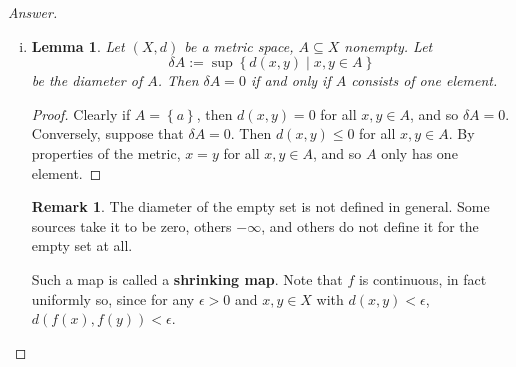 \documentclass[12pt]{article}
\newcommand\paren[1]{\left( #1 \right)}
\newcommand\setb[1]{\left \{ #1 \right \}}
\newtheorem{lemma}[theorem]{Lemma}
\theoremstyle{definition}
\newtheorem*{remark}{Remark}
\begin{document}
\begin{proof}[Answer]
    \noindent
    \begin{enumerate}[(i)]
        \item 
        \begin{lemma}
            Let $(X,d)$ be a metric space, $A \subseteq X$ nonempty. Let 
            \[
                \delta A := \sup \setb{ d(x,y) \mid x , y \in A }
            \]
            be the diameter of $A$. Then $\delta A = 0$ if and only if $A$ consists of one element.
        \end{lemma}
        \begin{proof}
            Clearly if $A = \setb{ a }$, then $d(x,y) = 0$ for all $x , y \in A$, and so $\delta A = 0$. Conversely, suppose that $\delta A = 0$. Then $d(x,y) \leq 0$ for all $x , y \in A$. By properties of the metric, $x = y$ for all $x , y \in A$, and so $A$ only has one element.
        \end{proof}
        \begin{remark}
            The diameter of the empty set is not defined in general. Some sources take it to be zero, others $-\infty$, and others do not define it for the empty set at all.
        \end{remark}
        Such a map is called a \textbf{shrinking map}. Note that $f$ is continuous, in fact uniformly so, since for any $\epsilon > 0$ and $x , y \in X$ with $d(x,y) < \epsilon$, $d \paren{ f(x) , f(y) } < \epsilon$.
        

\end{enumerate}
\end{proof}
\end{document}
